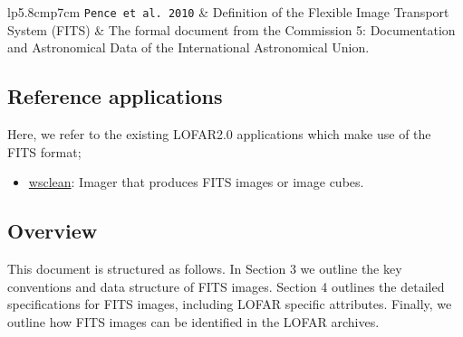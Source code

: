 \documentclass[a4paper,10pt,bibtotoc]{scrartcl}
\begin{document}
\begin{center}
  \tablelasttail{\hline}
  \begin{supertabular}{lp{5.8cm}p{7cm}}
    \shrinkheight{-4.5em}
    \texttt{Pence et al. 2010} \cite{FITSv3.0} & Definition of the Flexible Image Transport System (FITS) & The formal document from the Commission 5: Documentation and Astronomical Data of the International Astronomical Union. \\
    \hline
  \end{supertabular}
\end{center}

\subsection{Reference applications}
Here, we refer to the existing LOFAR2.0 applications which make use of the FITS format;
\begin{itemize}
    \item \href{https://wsclean.readthedocs.io/en/latest/}{wsclean}: Imager that produces  FITS images or image cubes.
\end{itemize}

\subsection{Overview}

This document is structured as follows. In Section 3 we outline the key conventions and data structure of FITS images. Section 4 outlines the detailed specifications for FITS images, including LOFAR specific attributes. Finally, we outline how FITS images can be identified in the LOFAR archives.
\end{document}
